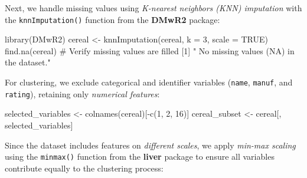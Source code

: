\documentclass[
  11pt,
]{book}
\makeatletter
\newenvironment{Shaded}{}{}
\newcommand{\AttributeTok}[1]{#1}
\newcommand{\CommentTok}[1]{\textcolor[rgb]{0.36,0.36,0.36}{#1}}
\newcommand{\ConstantTok}[1]{#1}
\newcommand{\DecValTok}[1]{#1}
\newcommand{\FunctionTok}[1]{#1}
\newcommand{\NormalTok}[1]{#1}
\newcommand{\OtherTok}[1]{\textcolor[rgb]{0.39,0.39,0.39}{#1}}
\newcommand{\SpecialCharTok}[1]{\textcolor[rgb]{0.39,0.39,0.39}{#1}}
\newcommand{\StringTok}[1]{\textcolor[rgb]{0.39,0.39,0.39}{#1}}
\newenvironment{kframe}{%
\medskip{}
\setlength{\fboxsep}{.8em}
 \def\at@end@of@kframe{}%
 \ifinner\ifhmode%
  \def\at@end@of@kframe{\end{minipage}}%
  \begin{minipage}{\columnwidth}%
 \fi\fi%
 \def\FrameCommand##1{\hskip\@totalleftmargin \hskip-\fboxsep
 \colorbox{shadecolor}{##1}\hskip-\fboxsep
     \hskip-\linewidth \hskip-\@totalleftmargin \hskip\columnwidth}%
 \MakeFramed {\advance\hsize-\width
   \@totalleftmargin\z@ \linewidth\hsize
   \@setminipage}}%
 {\par\unskip\endMakeFramed%
 \at@end@of@kframe}
\renewenvironment{Shaded}{\begin{kframe}}{\end{kframe}}
\theoremstyle{definition}
\theoremstyle{definition}
\theoremstyle{definition}
\theoremstyle{definition}
\theoremstyle{remark}
\makeatother
\begin{document}
Next, we handle missing values using \emph{K-nearest neighbors (KNN) imputation} with the \texttt{knnImputation()} function from the \textbf{DMwR2} package:

\begin{Shaded}
\begin{Highlighting}[]
\FunctionTok{library}\NormalTok{(DMwR2)}
\NormalTok{cereal }\OtherTok{\textless{}{-}} \FunctionTok{knnImputation}\NormalTok{(cereal, }\AttributeTok{k =} \DecValTok{3}\NormalTok{, }\AttributeTok{scale =} \ConstantTok{TRUE}\NormalTok{)}
\FunctionTok{find.na}\NormalTok{(cereal)  }\CommentTok{\# Verify missing values are filled}
\NormalTok{   [}\DecValTok{1}\NormalTok{] }\StringTok{" No missing values (NA) in the dataset."}
\end{Highlighting}
\end{Shaded}

For clustering, we exclude categorical and identifier variables (\texttt{name}, \texttt{manuf}, and \texttt{rating}), retaining only \emph{numerical features}:

\begin{Shaded}
\begin{Highlighting}[]
\NormalTok{selected\_variables }\OtherTok{\textless{}{-}} \FunctionTok{colnames}\NormalTok{(cereal)[}\SpecialCharTok{{-}}\FunctionTok{c}\NormalTok{(}\DecValTok{1}\NormalTok{, }\DecValTok{2}\NormalTok{, }\DecValTok{16}\NormalTok{)]}
\NormalTok{cereal\_subset }\OtherTok{\textless{}{-}}\NormalTok{ cereal[, selected\_variables]}
\end{Highlighting}
\end{Shaded}

Since the dataset includes features on \emph{different scales}, we apply \emph{min-max scaling} using the \texttt{minmax()} function from the \textbf{liver} package to ensure all variables contribute equally to the clustering process:
\end{document}
